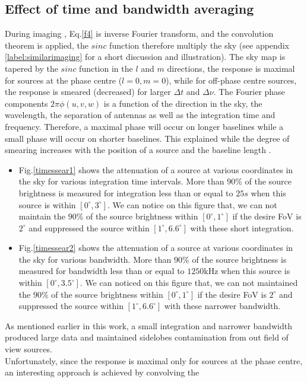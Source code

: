 \documentclass[useAMS,usenatbib]{mn2e}
\begin{document}
\subsection{Effect of time and bandwidth averaging}
During imaging \citep{briggs1999imaging}, Eq.\ref{f4} is inverse Fourier transform, and the convolution theorem is applied, the 
$sinc$ function therefore multiply the sky (see appendix \ref{label:similarimaging} for a short discussion and illustration). The 
sky map is tapered by the $sinc$ function in the $l$ and $m$ directions, the response is maximal for sources at the phase centre 
($l=0,m=0$), while for off-phase centre sources, the response is smeared (decreased) for larger $\Delta t$ and $\Delta \nu$. The 
Fourier phase components $2\pi \phi(u,v,w)$ is a function of the direction in the sky, the wavelength, the separation of antennas as well 
as the integration time and frequency. Therefore, a maximal phase will occur on longer baselines while a small phase will occur on shorter 
baselines. This explained while the degree of smearing increases with the position of a source and the baseline 
length \citep{bregman2012system}.
\begin{itemize}
 \item Fig.\ref{timessear1} shows the attenuation of a source at various coordinates in the sky for various integration time intervals. 
More than $90\%$ of the source brightness is measured for integration less than or equal to $25s$ when this source is within 
$[0^\circ,3^\circ]$. We can notice on this figure that, we can not maintain the $90\%$ of the source brightness within 
$[0^\circ,1^\circ]$ if the desire FoV is $2^\circ$ and suppressed the source within $[1^\circ,6.6^\circ]$ with these short integration.
  \item Fig.\ref{timessear2} shows the attenuation of a source at various coordinates in the sky for various bandwidth. More than $90\%$ of 
the source brightness is measured for bandwidth less than or equal to $1250$kHz when this source is within 
$[0^\circ,3.5^\circ]$. We can noticed on this figure that, we can not maintained the $90\%$ of the source brightness within 
$[0^\circ,1^\circ]$ if the desire FoV is $2^\circ$ and suppressed the source within $[1^\circ,6.6^\circ]$ with these narrower bandwidth.
\end{itemize}
As mentioned earlier in this work, a small integration and narrower bandwidth produced large data and maintained sidelobes contamination 
from out field of view sources.\\
Unfortunately, since the response is maximal only for sources at the phase centre, an interesting approach is achieved by convolving the 
\end{document}
